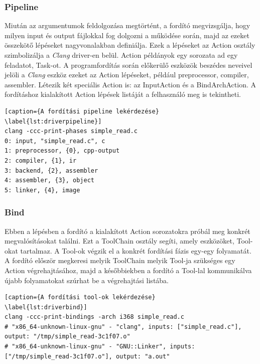 \documentclass[a4paper,12pt]{report}
\begin{document}
\subsubsection{Pipeline}
Miután az argumentumok feldolgozása megtörtént, a fordító megvizsgálja, hogy milyen input és output fájlokkal fog dolgozni a működése során, majd az ezeket összekötő lépéseket nagyvonalakban definiálja. Ezek a lépéseket az Action osztály szimbolizálja a \emph{Clang} driver-en belül. Action példányok egy sorozata ad egy feladatot, Task-ot. A programfordítás során előkerülő eszközök beszédes neveivel jelöli a \emph{Clang} eszköz ezeket az Action lépéseket, például preprocessor, compiler, assembler. Létezik két speciális Action is: az InputAction és a BindArchAction. A fordításhoz kialakított Action lépések listáját a felhasználó meg is tekintheti.

\begin{minipage}{\linewidth}
\begin{lstlisting}[caption={A fordítási pipeline lekérdezése}
\label{lst:driverpipeline}]
clang -ccc-print-phases simple_read.c 
0: input, "simple_read.c", c
1: preprocessor, {0}, cpp-output
2: compiler, {1}, ir
3: backend, {2}, assembler
4: assembler, {3}, object
5: linker, {4}, image
\end{lstlisting}
\end{minipage}

\subsubsection{Bind}
Ebben a lépésben a fordító a kialakított Action sorozatokra próbál meg konkrét megvalósításokat találni. Ezt a ToolChain osztály segíti, amely eszközöket, Tool-okat tartalmaz. A Tool-ok végzik el a konkrét fordítási fázis egy-egy folyamatát. A fordító először megkeresi melyik ToolChain melyik Tool-ja szükséges egy Action végrehajtásához, majd a későbbiekben a fordító a Tool-lal kommunikálva újabb folyamatokat szúrhat be a végrehajtási listába.

\begin{minipage}{\linewidth}
\begin{lstlisting}[caption={A fordítási tool-ok lekérdezése}
\label{lst:driverbind}]
clang -ccc-print-bindings -arch i368 simple_read.c
# "x86_64-unknown-linux-gnu" - "clang", inputs: ["simple_read.c"], output: "/tmp/simple_read-3c1f07.o"
# "x86_64-unknown-linux-gnu" - "GNU::Linker", inputs: ["/tmp/simple_read-3c1f07.o"], output: "a.out"
\end{lstlisting}
\end{minipage}
\end{document}
